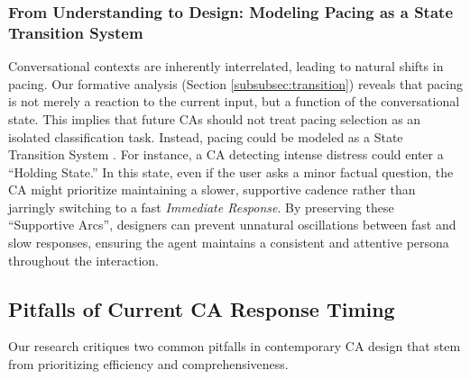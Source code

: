 \subsubsection{From Understanding to Design: Modeling Pacing as a State Transition System}
Conversational contexts are inherently interrelated, leading to natural shifts in pacing. Our formative analysis (Section \ref{subsubsec:transition}) reveals that pacing is not merely a reaction to the current input, but a function of the conversational state. This implies that future CAs should not treat pacing selection as an isolated classification task. Instead, pacing could be modeled as a State Transition System \cite{young2013pomdp}. For instance, a CA detecting intense distress could enter a ``Holding State.'' In this state, even if the user asks a minor factual question, the CA might prioritize maintaining a slower, supportive cadence rather than jarringly switching to a fast \emph{Immediate Response}. By preserving these ``Supportive Arcs'', designers can prevent unnatural oscillations between fast and slow responses, ensuring the agent maintains a consistent and attentive persona throughout the interaction.

\subsection{Pitfalls of Current CA Response Timing}
Our research critiques two common pitfalls in contemporary CA design that stem from prioritizing efficiency and comprehensiveness.

